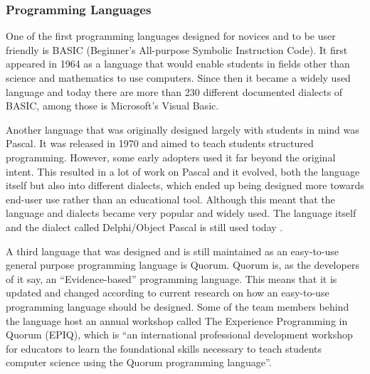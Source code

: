 \subsubsection{Programming Languages}
One of the first programming languages designed for novices and to be user friendly is BASIC (Beginner's All-purpose Symbolic Instruction Code). It first appeared in 1964 as a language that would enable students in fields other than science and mathematics to use computers. Since then it became a widely used language and today there are more than 230 different documented dialects of BASIC, among those is Microsoft's Visual Basic.

Another language that was originally designed largely with students in mind was Pascal. It was released in 1970 and aimed to teach students structured programming. However, some early adopters used it far beyond the original intent. This resulted in a lot of work on Pascal and it evolved, both the language itself but also into different dialects, which ended up being designed more towards end-user use rather than an educational tool. Although this meant that the language and dialects became very popular and widely used. The language itself and the dialect called Delphi/Object Pascal is still used today \cite{tiobe}.

A third language that was designed and is still maintained as an easy-to-use general purpose programming language is Quorum. Quorum is, as the developers of it say, an ``Evidence-based'' programming language. This means that it is updated and changed according to current research on how an easy-to-use programming language should be designed. Some of the team members behind the language host an annual workshop called The Experience Programming in Quorum (EPIQ), which is ``an international professional development workshop for educators to learn the foundational skills necessary to teach students computer science using the Quorum programming language''\cite{quorum_epiq}.

\\
\\

\\
\\
\\
\\
\\

